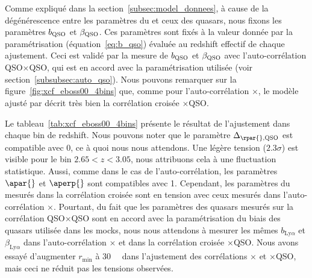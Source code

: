Comme expliqué dans la section~\ref{subsec:model_donnees}, à cause de la dégénérescence entre les paramètres du \lya{} et ceux des quasars, nous fixons les paramètres $b_{\textsc{QSO}}$ et $\beta_{\textsc{QSO}}$. Ces paramètres sont fixés à la valeur donnée par la paramétrisation (équation~\ref{eq:b_qso}) évaluée au redshift effectif de chaque ajustement. Ceci est validé par la mesure de $b_{\textsc{QSO}}$ et $\beta_{\textsc{QSO}}$ avec l'auto-corrélation QSO$\times$QSO, qui est en accord avec la paramétrisation utilisée (voir section~\ref{subsubsec:auto_qso}).
Nous pouvons remarquer sur la figure~\ref{fig:xcf_eboss00_4bins} que, comme pour l'auto-corrélation \lya$\times$\lya{}, le modèle ajusté par \picca{} décrit très bien la corrélation croisée \lya{}$\times$QSO.

Le tableau~\ref{tab:xcf_eboss00_4bins} présente le résultat de l'ajustement dans chaque bin de redshift.
Nous pouvons noter que le paramètre $\Delta_{\rpar{}, \textsc{QSO}}$ est compatible avec 0, ce à quoi nous nous attendons. Une légère tension ($\num{2.3}\sigma$) est visible pour le bin $\num{2.65} < z < \num{3.05}$, nous attribuons cela à une fluctuation statistique.
Aussi, comme dans le cas de l'auto-corrélation, les paramètres $\apar{}$ et $\aperp{}$ sont compatibles avec 1.
Cependant, les paramètres du \lya{} mesurés dans la corrélation croisée sont en tension avec ceux mesurés dans l'auto-corrélation \lya{}$\times$\lya{}. Pourtant, du fait que les paramètres des quasars mesurés sur la corrélation QSO$\times$QSO sont en accord avec la paramétrisation du biais des quasars utilisée dans les mocks, nous nous attendons à mesurer les mêmes $b_{\mathrm{Ly}\alpha}$ et $\beta_{\mathrm{Ly}\alpha}$ dans l'auto-corrélation \lya{}$\times$\lya{} et dans la corrélation croisée \lya{}$\times$QSO.
Nous avons essayé d'augmenter $r_{\mathrm{min}}$ à \SI{30}{\perh\Mpc} dans l'ajustement des corrélations \lya{}$\times$\lya{} et \lya{}$\times$QSO, mais ceci ne réduit pas les tensions observées.

